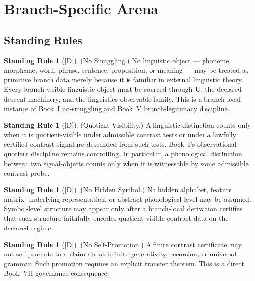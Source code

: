 \documentclass[12pt,oneside]{amsbook}
\theoremstyle{plain}
\theoremstyle{definition}
\newtheorem{standingrule}[theorem]{Standing Rule}
\theoremstyle{remark}
\newcommand{\status}[1]{\textup{[#1]}}
\begin{document}
\section{Branch-Specific Arena}\label{sec:ling-arena}

\subsection{Standing Rules}\label{sec:ling-standing-rules}

\begin{standingrule}[\status{D}]\label{sr:ling-no-smuggling}
\textup{(No Smuggling.)}
No linguistic object --- phoneme, morpheme, word, phrase, sentence,
proposition, or meaning --- may be treated as primitive branch data
merely because it is familiar in external linguistic theory. Every
branch-visible linguistic object must be sourced through $\mathbf{U}$,
the declared descent machinery, and the linguistics observable family.
This is a branch-local instance of Book~I no-smuggling and Book~V
branch-legitimacy discipline.
\end{standingrule}

\begin{standingrule}[\status{D}]\label{sr:ling-quotient-visible}
\textup{(Quotient Visibility.)}
A linguistic distinction counts only when it is quotient-visible under
admissible contrast tests or under a lawfully certified contrast
signature descended from such tests. Book~I's observational quotient
discipline remains controlling. In particular, a phonological
distinction between two signal-objects counts only when it is
witnessable by some admissible contrast probe.
\end{standingrule}

\begin{standingrule}[\status{D}]\label{sr:ling-no-hidden-symbol}
\textup{(No Hidden Symbol.)}
No hidden alphabet, feature matrix, underlying representation, or
abstract phonological level may be assumed. Symbol-level structure may
appear only after a branch-local derivation certifies that such
structure faithfully encodes quotient-visible contrast data on the
declared regime.
\end{standingrule}

\begin{standingrule}[\status{D}]\label{sr:ling-no-self-promotion}
\textup{(No Self-Promotion.)}
A finite contrast certificate may not self-promote to a claim about
infinite generativity, recursion, or universal grammar. Such promotion
requires an explicit transfer theorem. This is a direct Book~VII
governance consequence.
\end{standingrule}
\end{document}
